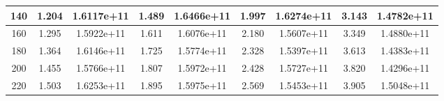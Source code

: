 \documentclass{article}
\begin{document}
\begin{table}[H]
\begin{tabular}{|c|cc|cc|cc|cc|}
    140                                             & \multicolumn{1}{c|}{1.204}                                           & 1.6117e+11                                           & \multicolumn{1}{c|}{1.489}                                           & 1.6466e+11                                           & \multicolumn{1}{c|}{1.997}                                           & 1.6274e+11                                           & \multicolumn{1}{c|}{3.143}                                           & 1.4782e+11                                           \\ \hline
    160                                             & \multicolumn{1}{c|}{1.295}                                           & 1.5922e+11                                           & \multicolumn{1}{c|}{1.611}                                           & 1.6076e+11                                           & \multicolumn{1}{c|}{2.180}                                           & 1.5607e+11                                           & \multicolumn{1}{c|}{3.349}                                           & 1.4880e+11                                           \\ \hline
    180                                             & \multicolumn{1}{c|}{1.364}                                           & 1.6146e+11                                           & \multicolumn{1}{c|}{1.725}                                           & 1.5774e+11                                           & \multicolumn{1}{c|}{2.328}                                           & 1.5397e+11                                           & \multicolumn{1}{c|}{3.613}                                           & 1.4383e+11                                           \\ \hline
    200                                             & \multicolumn{1}{c|}{1.455}                                           & 1.5766e+11                                           & \multicolumn{1}{c|}{1.807}                                           & 1.5972e+11                                           & \multicolumn{1}{c|}{2.428}                                           & 1.5727e+11                                           & \multicolumn{1}{c|}{3.820}                                           & 1.4296e+11                                           \\ \hline
    220                                             & \multicolumn{1}{c|}{1.503}                                           & 1.6253e+11                                           & \multicolumn{1}{c|}{1.895}                                           & 1.5975e+11                                           & \multicolumn{1}{c|}{2.569}                                           & 1.5453e+11                                           & \multicolumn{1}{c|}{3.905}                                           & 1.5048e+11                                           \\ \hline

\end{tabular}
\end{table}
\end{document}

